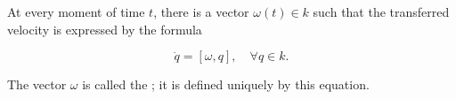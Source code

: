 At every moment of time $t$, there is a vector $\omega(t) \in k$ such that the transferred velocity is expressed by the formula

$$\dot{q} = [\omega, q], \quad \forall q \in k.$$

The vector $\omega$ is called the ; it is defined uniquely by this equation.

